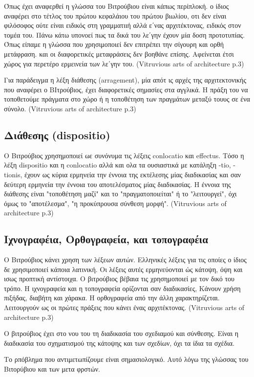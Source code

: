 Όπως έχει αναφερθεί η γλώσσα του Βιτρούβιου είναι κάπως περίπλοκή. ο ίδιος
αναφέρει στο τέτλος του πρώτου κεφαλάιου του πρώτου βιωλίου, οτι δεν είναι
φιλόσοφος ούτε είναι ειδικός στη γραμματιιή αλλά ε΄νας αρχιτέκτονας, ειδικός
στον τομέα του. Πάνω κάτω υπονοεί πως τα δικά του λε΄γην έχουν μία δοση
προτοτυπίας. Όπως είπαμε η γλώσσα που χρησιμοποιεί δεν επιτρέπει την σίγουρη και
ορθή μετάφραση. και οι διαφορετικές μεταφράσεις δεν βοηθάνε επίσης. Αφείνεται
έτσι χώρος για περετέρο ερμεινεία των λε΄γην του. (Vitruvious arts of
architecture p.3)

Για παράδειγμα η λέξη διάθεσης (arragement), μία απότ ις αρχές της
αρχιτεκτονικής που αναφέρει ο ΒΙτρούβιος, έχει διαφορετικές σημασίες στα
αγγλικά. Η πράξη του να τοποθετούμε πράγματα στο χώρο ή η τοποθέτηση των
πραγμάτων μεταξύ τουυς σε ένα σύνολο. (Vitruvious arts of architecture p.3)  

\subsection{Διάθεσης (dispositio)}

Ο Βιτρούβιος χρησημοποιεί ωε συνόνυμα τις λέξεις conlocatio και effectus. Τόσο
η λέξη dispositio και η conlocatio αλλά και ολα τα ουσιαστικά με κατάληξη -tio,
-tionis, έχουν ως κύρια ερμηνεία την έννοια της εκτέλεσης μίας διαδικασίας και
σαν δεύτερη ερμηνεία την έννοια του αποτελέσματος μίας διαδικασίας. Η έννοια της
διάθεσης είναι "τοποθέτηση μαζί" και το "πραγματοποιείται" ή το "λειτουργεί",
όχι όμως το "αποτέλεσμα", "η προκύπρουσα σύνθεση μορφή". (Vitruvious arts of
architecture p.3)

\subsection{Ιχνογραφέια, Ορθογραφεία, και τοπογραφέια}

Ο Βιτρούβιος κάνει χρηση των λέξεων αυτών. Ελληνικές λέξεις για τις οποίες ο
ίδιος δε χρησιμοποιεί κάποια λατινική. Οι λέξεις αυτές ερμηνεύονται ώς κάτοψη,
όψη και ισως προπτική αντίστοιχα. Ο βιτρούβιος βέβαια τις χρησημοποιεί με τον
δικό του τρόπο. Η ιχνογραφεία και η τοπογραφεία ορίζονται σαν διαδικασίες,
Κάνουν χρήση πιξήδας, διαβήτη και χάρακα. Η ορθογραφεία από την άλλη
χαρακτηρίζεται. Λειτουργούν ως οι πρώτες πράξεις που κάνει ένας αρχιτέκτονας.
(Vitruvious arts of architecture p.3)

Ο βιτρούβιος έχει στο νου του τη διαδικασία του σχεδιαμού και σύνθεσης. Είναι
η διαδικασία του σχηματισμού της κάτοψης και των σχεδίων, όχι τα ίδια τα σχέδια.

Το ρπόβλημα που αντιμετωπίζουμε είναι σημασιολογικό. Αυτό λόγω της γλώσσας του
Βιτορύβιου και των μετα φρστών. 

